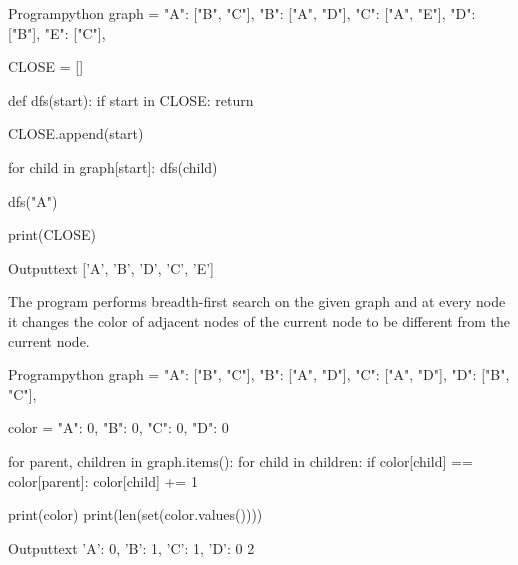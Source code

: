 \documentclass[11pt]{ipu-ai}
\begin{document}
    \begin{code}
        {Program}{python}
graph = {
    "A": ["B", "C"],
    "B": ["A", "D"],
    "C": ["A", "E"],
    "D": ["B"],
    "E": ["C"],
}

CLOSE = []


def dfs(start):
    if start in CLOSE:
        return

    CLOSE.append(start)

    for child in graph[start]:
        dfs(child)


dfs("A")

print(CLOSE)
    \end{code}
    \begin{code}
        {Output}{text}
['A', 'B', 'D', 'C', 'E']
    \end{code}


    {The program performs breadth-first search on the given graph and at every node it changes the color of adjacent
    nodes of the current node to be different from the current node.%
        \begin{center}%
        \end{center}\vspace*{2pt}%
    }%
    \begin{code}
        {Program}{python}
graph = {
    "A": ["B", "C"],
    "B": ["A", "D"],
    "C": ["A", "D"],
    "D": ["B", "C"],
}

color = {
    "A": 0,
    "B": 0,
    "C": 0,
    "D": 0
}

for parent, children in graph.items():
    for child in children:
        if color[child] == color[parent]:
            color[child] += 1

print(color)
print(len(set(color.values())))
    \end{code}
    \begin{code}
        {Output}{text}
{'A': 0, 'B': 1, 'C': 1, 'D': 0}
2
    \end{code}
\end{document}
